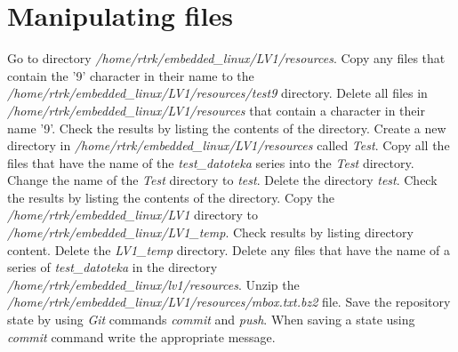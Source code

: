 \documentclass[11pt]{article}
\begin{document}
\section{Manipulating files}
Go to directory \textit{/home/rtrk/embedded\_linux/LV1/resources}.
 Copy any files that contain the '9' character in their name to the \\
 \textit{/home/rtrk/embedded\_linux/LV1/resources/test9} directory. Delete all
 files in \textit{/home/rtrk/embedded\_linux/LV1/resources} that contain a
 character in their name '9'. Check the results by listing the contents of the
 directory.
\newline
\newline
Create a new directory in \textit{/home/rtrk/embedded\_linux/LV1/resources}
 called \textit{Test}. Copy all the files that have the name of the
 \textit{test\_datoteka} series into the \textit{Test} directory. Change the
 name of the \textit{Test} directory to \textit{test}. Delete the directory
 \textit{test}. Check the results by listing the contents of the directory.
\newline
\newline
Copy the \textit{/home/rtrk/embedded\_linux/LV1} directory to \\
\textit{/home/rtrk/embedded\_linux/LV1\_temp}. Check results by listing
 directory content. Delete the \textit{LV1\_temp} directory.
\newline
\newline
Delete any files that have the name of a series of \textit{test\_datoteka} in
 the directory \textit{/home/rtrk/embedded\_linux/lv1/resources}.
\newline
\newline
Unzip the \textit{/home/rtrk/embedded\_linux/LV1/resources/mbox.txt.bz2} file.
 Save the repository state by using \textit{Git} commands \textit{commit} and
 \textit{push}. When saving a state using \textit{commit} command write the
 appropriate message.
\end{document}
